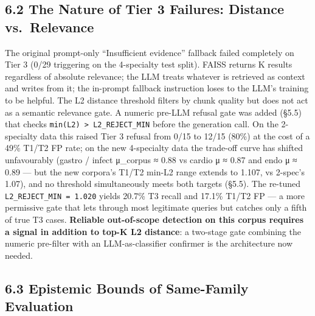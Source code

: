 \documentclass[
  american,
  a4paper,
]{article}
\begin{document}
\subsection{6.2 The Nature of Tier 3 Failures: Distance
vs.~Relevance}\label{the-nature-of-tier-3-failures-distance-vs.-relevance}

The original prompt-only ``Insufficient evidence'' fallback failed
completely on Tier 3 (0/29 triggering on the 4-specialty test split).
FAISS returns K results regardless of absolute relevance; the LLM treats
whatever is retrieved as context and writes from it; the in-prompt
fallback instruction loses to the LLM's training to be helpful. The L2
distance threshold filters by chunk quality but does not act as a
semantic relevance gate. A numeric pre-LLM refusal gate was added (§5.5)
that checks \texttt{min(L2)\ \textgreater{}\ L2\_REJECT\_MIN} before the
generation call. On the 2-specialty data this raised Tier 3 refusal from
0/15 to 12/15 (80\%) at the cost of a 49\% T1/T2 FP rate; on the new
4-specialty data the trade-off curve has shifted unfavourably (gastro /
infect μ\_corpus ≈ 0.88 vs cardio μ ≈ 0.87 and endo μ ≈ 0.89 --- but the
new corpora's T1/T2 min-L2 range extends to 1.107, vs 2-spec's 1.07),
and no threshold simultaneously meets both targets (§5.5). The re-tuned
\texttt{L2\_REJECT\_MIN\ =\ 1.020} yields 20.7\% T3 recall and 17.1\%
T1/T2 FP --- a more permissive gate that lets through most legitimate
queries but catches only a fifth of true T3 cases. \textbf{Reliable
out-of-scope detection on this corpus requires a signal in addition to
top-K L2 distance}: a two-stage gate combining the numeric pre-filter
with an LLM-as-classifier confirmer is the architecture now needed.

\subsection{6.3 Epistemic Bounds of Same-Family
Evaluation}\label{epistemic-bounds-of-same-family-evaluation}
\end{document}
